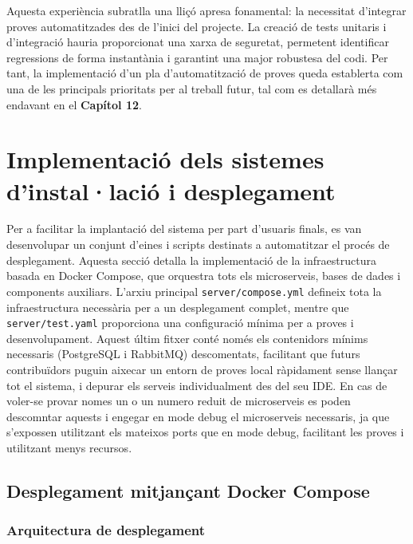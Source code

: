 Aquesta experiència subratlla una lliçó apresa fonamental: la necessitat d'integrar proves automatitzades des de l'inici del projecte. La creació de tests unitaris i d'integració hauria proporcionat una xarxa de seguretat, permetent identificar regressions de forma instantània i garantint una major robustesa del codi. Per tant, la implementació d'un pla d'automatització de proves queda establerta com una de les principals prioritats per al treball futur, tal com es detallarà més endavant en el \textbf{Capítol 12}.

\section{Implementació dels sistemes d'instal·lació i desplegament}

Per a facilitar la implantació del sistema per part d'usuaris finals, es van desenvolupar un conjunt d'eines i scripts destinats a automatitzar el procés de desplegament. Aquesta secció detalla la implementació de la infraestructura basada en Docker Compose, que orquestra tots els microserveis, bases de dades i components auxiliars. L'arxiu principal \texttt{server/compose.yml} defineix tota la infraestructura necessària per a un desplegament complet, mentre que \texttt{server/test.yaml} proporciona una configuració mínima per a proves i desenvolupament. Aquest últim fitxer conté només els contenidors mínims necessaris (PostgreSQL i RabbitMQ) descomentats, facilitant que futurs contribuïdors puguin aixecar un entorn de proves local ràpidament sense llançar tot el sistema, i depurar els serveis individualment des del seu IDE. En cas de voler-se provar nomes un o un numero reduit de microserveis es poden descomntar aquests i engegar en mode debug el microserveis necessaris, ja que s'expossen utilitzant els mateixos ports que en mode debug, facilitant les proves i utilitzant menys recursos.

\subsection{Desplegament mitjançant Docker Compose}

\subsubsection{Arquitectura de desplegament}

